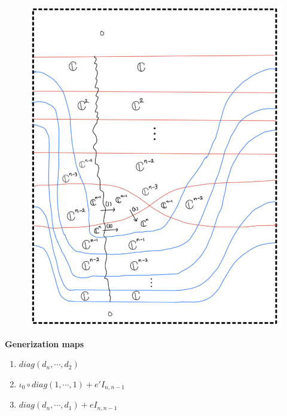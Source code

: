 \begin{enumerate}[label = (\roman*)]
\begin{enumerate}[label = (Case \arabic*)]
\begin{enumerate}[label = (Step \arabic*)]
\begin{figure}[H]
    \centering
    \includegraphics[scale = 0.95]{diagrams/cobord_gen/19.png}
    \caption{}
    \label{fig:your-label}
\end{figure}
\textbf{Generization maps}
\begin{enumerate}[label = (\arabic*)]
\item $diag(d_{n},\cdots,d_{2})$
\item $\iota_0 \circ diag(1,\cdots,1) + e' I_{n,n-1}$
\item $diag(d_{n},\cdots,d_1) + e I_{n,n-1}$
\end{enumerate}
\end{enumerate}
\end{enumerate}
\end{enumerate}
\pagebreak